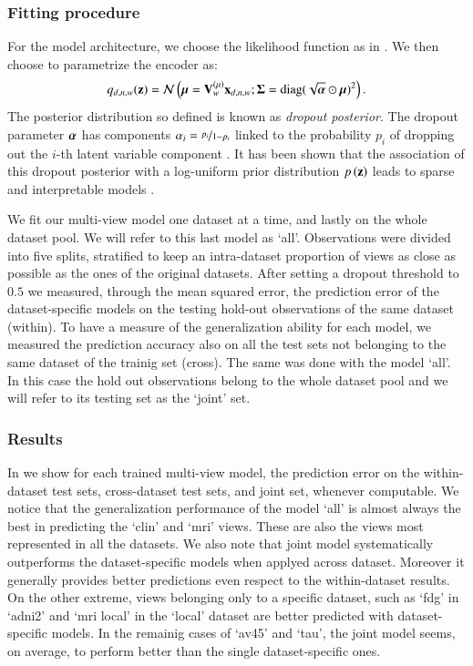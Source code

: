 \subsubsection{Fitting procedure}
For the model architecture, we choose the likelihood function as in .
We then choose to parametrize the encoder as:
\begin{equation}
\label{eq:dropout_posterior}
    q_{d,n,w}(\mathbf{z}) = \mathcal{N}\left(\boldsymbol{\mu} = \mathbf{V}_w^{(\mu)} \mathbf{x}_{d,n,w};\boldsymbol{\Sigma} = \text{diag}(\sqrt{\boldsymbol{\alpha}} \odot \boldsymbol{\mu})^2\right).
\end{equation}
The posterior distribution so defined is known as \textit{dropout posterior}.
The dropout parameter $\boldsymbol{\alpha}$ has components $\alpha_i = \nicefrac{p_i}{1-p_i}$ linked to the probability $p_i$ of dropping out the $i$-th latent variable component \cite{Wang2013}.
It has been shown that the association of this dropout posterior with a log-uniform prior distribution $p\left(\mathbf{z}\right)$ leads to sparse and interpretable models \cite{Antelmi2019,Molchanov2017}.

We fit our multi-view model one dataset at a time, and lastly on the whole dataset pool.
We will refer to this last model as `all'.
Observations were divided into five splits, stratified to keep an intra-dataset proportion of views as close as possible as the ones of the original datasets.
After setting a dropout threshold to $0.5$ we measured, through the mean squared error, the prediction error of the dataset-specific models on the testing hold-out observations of the same dataset (within).
To have a measure of the generalization ability for each model, we measured the prediction accuracy also on all the test sets not belonging to the same dataset of the trainig set (cross).
The same was done with the model `all'.
In this case the hold out observations belong to the whole dataset pool and we will refer to its testing set as the `joint' set.

\subsubsection{Results}
In  we show for each trained multi-view model, the prediction error on the within-dataset test sets, cross-dataset test sets, and joint set, whenever computable.
We notice that the generalization performance of the model `all' is almost always the best in predicting the `clin' and `mri' views.
These are also the views most represented in all the datasets.
We also note that joint model systematically outperforms the dataset-specific models when applyed across dataset.
Moreover it generally provides better predictions even respect to the within-dataset results.
On the other extreme, views belonging only to a specific dataset, such as `fdg' in `adni2' and `mri local' in the `local' dataset are better predicted with dataset-specific models.
In the remainig cases of `av45' and `tau', the joint model seems, on average, to perform better than the single dataset-specific ones.


